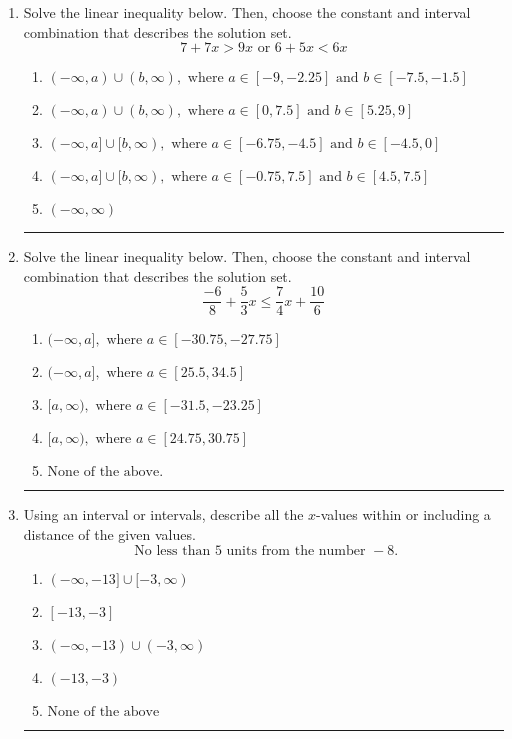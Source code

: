 \documentclass[14pt]{extbook}
\newcommand{\litem}[1]{\item#1\hspace*{-1cm}\rule{\textwidth}{0.4pt}}
\begin{document}
\begin{enumerate}
\litem{
Solve the linear inequality below. Then, choose the constant and interval combination that describes the solution set.\[ 7 + 7 x > 9 x \text{ or } 6 + 5 x < 6 x \]\begin{enumerate}[label=\Alph*.]
\item \( (-\infty, a) \cup (b, \infty), \text{ where } a \in [-9, -2.25] \text{ and } b \in [-7.5, -1.5] \)
\item \( (-\infty, a) \cup (b, \infty), \text{ where } a \in [0, 7.5] \text{ and } b \in [5.25, 9] \)
\item \( (-\infty, a] \cup [b, \infty), \text{ where } a \in [-6.75, -4.5] \text{ and } b \in [-4.5, 0] \)
\item \( (-\infty, a] \cup [b, \infty), \text{ where } a \in [-0.75, 7.5] \text{ and } b \in [4.5, 7.5] \)
\item \( (-\infty, \infty) \)

\end{enumerate} }
\litem{
Solve the linear inequality below. Then, choose the constant and interval combination that describes the solution set.\[ \frac{-6}{8} + \frac{5}{3} x \leq \frac{7}{4} x + \frac{10}{6} \]\begin{enumerate}[label=\Alph*.]
\item \( (-\infty, a], \text{ where } a \in [-30.75, -27.75] \)
\item \( (-\infty, a], \text{ where } a \in [25.5, 34.5] \)
\item \( [a, \infty), \text{ where } a \in [-31.5, -23.25] \)
\item \( [a, \infty), \text{ where } a \in [24.75, 30.75] \)
\item \( \text{None of the above}. \)

\end{enumerate} }
\litem{
Using an interval or intervals, describe all the $x$-values within or including a distance of the given values.\[ \text{ No less than } 5 \text{ units from the number } -8. \]\begin{enumerate}[label=\Alph*.]
\item \( (-\infty, -13] \cup [-3, \infty) \)
\item \( [-13, -3] \)
\item \( (-\infty, -13) \cup (-3, \infty) \)
\item \( (-13, -3) \)
\item \( \text{None of the above} \)


\end{enumerate}}
\end{enumerate}
\end{document}
